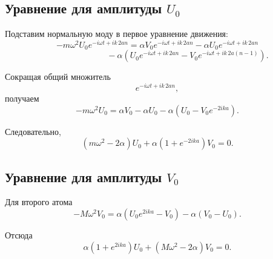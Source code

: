 \documentclass[../final.tex]{subfiles}
\begin{document}

\subsection*{Уравнение для амплитуды $U_0$}

Подставим нормальную моду в первое уравнение движения:
%
\begin{equation*}
    -m\omega^2
    U_0e^{-i\omega t+ik\,2an}
    =
    \alpha
    V_0e^{-i\omega t+ik\,2an}
    -
    \alpha
    U_0e^{-i\omega t+ik\,2an}
\end{equation*}
%
\begin{equation*}
    \hspace{3cm}
    -
    \alpha
    \left(
        U_0e^{-i\omega t+ik\,2an}
        -
        V_0e^{-i\omega t+ik\,2a(n-1)}
    \right).
\end{equation*}
%

Сокращая общий множитель
%
\begin{equation*}
    e^{-i\omega t+ik\,2an},
\end{equation*}
%
получаем
%
\begin{equation*}
    -m\omega^2U_0
    =
    \alpha V_0
    -
    \alpha U_0
    -
    \alpha
    \left(
        U_0-V_0e^{-2ika}
    \right).
\end{equation*}
%

Следовательно,
%
\begin{equation*}
    \left(
        m\omega^2-2\alpha
    \right)U_0
    +
    \alpha
    \left(
        1+e^{-2ika}
    \right)V_0
    =
    0.
\end{equation*}



\subsection*{Уравнение для амплитуды $V_0$}

Для второго атома
%
\begin{equation*}
    -M\omega^2V_0
    =
    \alpha
    \left(
        U_0e^{2ika}-V_0
    \right)
    -
    \alpha
    \left(
        V_0-U_0
    \right).
\end{equation*}
%

Отсюда
%
\begin{equation*}
    \alpha
    \left(
        1+e^{2ika}
    \right)U_0
    +
    \left(
        M\omega^2-2\alpha
    \right)V_0
    =
    0.
\end{equation*}
\end{document}
